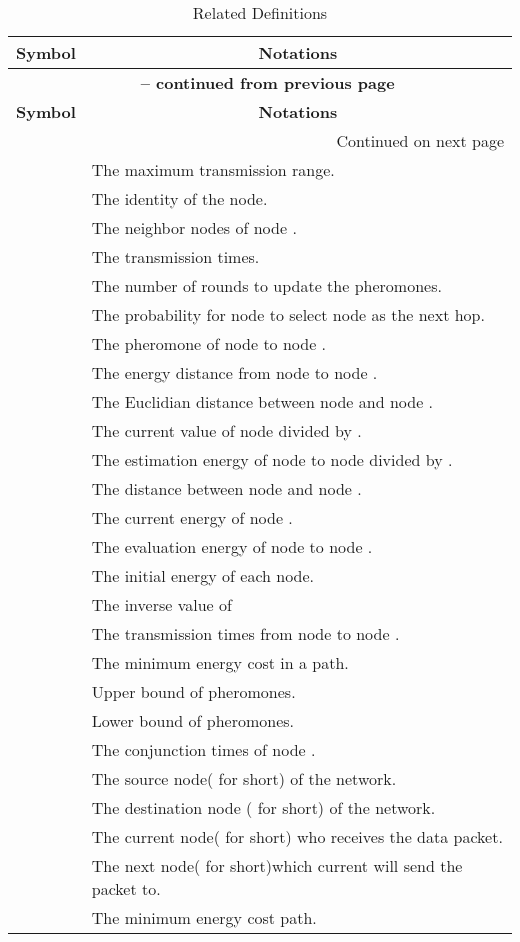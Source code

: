 \documentclass{elsarticle}
\begin{document}
\begin{center}
\begin{longtable}{|c|p{6cm}|}
\caption{Related Definitions} \label{tab:definitions} \\\hline
\multicolumn{1}{|c|}{\textbf{Symbol}} & \multicolumn{1}{c|}{\textbf{Notations}} \\
\hline \endfirsthead \multicolumn{2}{c}{{\bfseries \tablename\ \thetable{} -- continued from previous page}} \\
\hline \multicolumn{1}{|c|}{\textbf{Symbol}} &\multicolumn{1}{c|}{\textbf{Notations}} \\
\hline \endhead \hline \multicolumn{2}{|r|}{{Continued on next page}} \\
\hline\endfoot \hline \hline\endlastfoot
 & The maximum transmission range. \\
 & The identity of the node. \\
 & The neighbor nodes of node . \\
 & The transmission times. \\
 & The number of rounds to update the pheromones. \\
 & The probability for node  to select node  as the next hop.\\
 & The pheromone of node  to node .\\
 & The energy distance from node  to node .\\
 & The Euclidian distance between node  and node . \\
 & The current value of node  divided by . \\
 & The estimation energy of node  to node  divided by  . \\
 & The distance between node  and node . \\
 & The current energy of node .\\
 & The evaluation energy of node  to node .\\
 & The initial energy of each node. \\
 & The inverse value of  \\
 & The transmission times from node  to node . \\

 & The minimum energy cost in a path. \\
 & Upper bound of pheromones. \\
 & Lower bound of pheromones. \\
 & The conjunction times of node . \\
 & The source node( for short) of the network. \\
 & The destination node ( for short) of the network. \\
 & The current node( for short) who receives the data packet. \\
 & The next node( for short)which current will send the packet to.\\
 & The minimum energy cost path. \\
\end{longtable}
\end{center}
\end{document}
